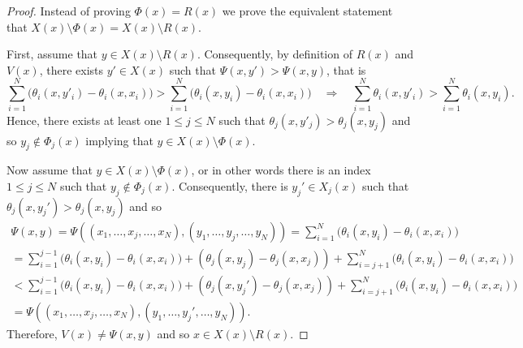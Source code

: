 \documentclass[10pt,a4paper]{amsart}
\begin{document}
\begin{proof}
	Instead of proving $\Phi(x)=R(x)$ we prove the equivalent statement that $X(x)\setminus\Phi(x)=X(x)\setminus R(x)$.

	\medskip\noindent
	First, assume that $y\in X(x)\setminus R(x)$.
	Consequently, by definition of $R(x)$ and $V(x)$, there exists $y'\in X(x)$ such that $\Psi(x,y') > \Psi(x,y)$, that is
	\[
		\sum_{i=1}^{N}\bigl(\theta_i(x,y'_i)-\theta_i(x,x_i)\bigr) > \sum_{i=1}^{N}\bigl(\theta_i(x,y_i)-\theta_i(x,x_i)\bigr) \quad \Longrightarrow \quad
		\sum_{i=1}^{N}\theta_i(x,y'_i) > \sum_{i=1}^{N}\theta_i(x,y_i).
	\]
	Hence, there exists at least one $1\leq j\leq N$ such that $\theta_j(x,y'_j) > \theta_j(x,y_j)$ and so $y_j\not\in \Phi_j(x)$ implying that  $y\in X(x)\setminus\Phi(x)$.

	\medskip
	Now assume that $y \in X(x)\setminus\Phi(x)$, or in other words there is an index $1\leq j\leq N$ such that $y_j\not\in \Phi_j(x)$.
	Consequently, there is $y_j'\in X_j(x)$ such that $\theta_j(x,y_j') > \theta_j(x,y_j)$ and so
	\begin{multline*}
		\Psi(x,y) = \Psi((x_1,\dots,x_j,\dots,x_N),(y_1,\dots,y_j,\dots,y_N)) = \sum_{i=1}^{N}\bigl(\theta_i(x,y_i)-\theta_i(x,x_i)\bigr) \\ =
		\sum_{i=1}^{j-1}\bigl(\theta_i(x,y_i)-\theta_i(x,x_i)\bigr) + (\theta_j(x,y_j)-\theta_j(x,x_j)) + \sum_{i=j+1}^{N}\bigl(\theta_i(x,y_i)-\theta_i(x,x_i)\bigr) \\ < \sum_{i=1}^{j-1}\bigl(\theta_i(x,y_i)-\theta_i(x,x_i)\bigr) + (\theta_j(x,y_j')-\theta_j(x,x_j)) + \sum_{i=j+1}^{N}\bigl(\theta_i(x,y_i)-\theta_i(x,x_i)\bigr)   \\ =  \Psi((x_1,\dots,x_j,\dots,x_N),(y_1,\dots,y_j',\dots,y_N)).
	\end{multline*}
	Therefore, $V(x)\neq\Psi(x,y)$ and so $x\in X(x)\setminus R(x)$.
\end{proof}
\end{document}
